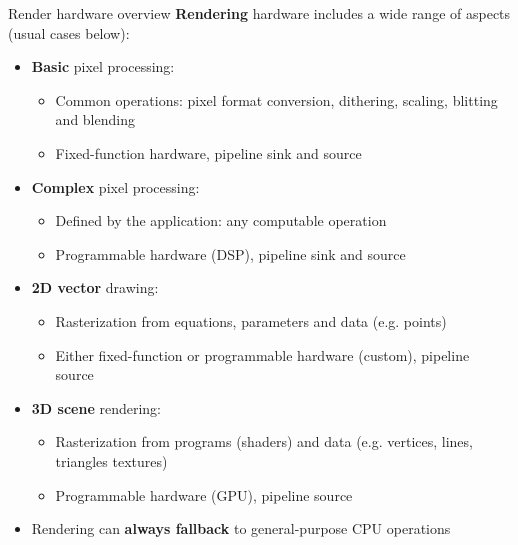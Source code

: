 \begin{frame}{Render hardware overview}
  \textbf{Rendering} hardware includes a wide range of aspects (usual cases below):
  \begin{itemize}
  \item \textbf{Basic} pixel processing:
  \begin{itemize}
    \item Common operations: pixel format conversion, dithering, scaling, blitting and blending
    \item Fixed-function hardware, pipeline sink and source
  \end{itemize}
  \item \textbf{Complex} pixel processing:
  \begin{itemize}
    \item Defined by the application: any computable operation
    \item Programmable hardware (DSP), pipeline sink and source
  \end{itemize}
  \item \textbf{2D vector} drawing:
  \begin{itemize}
    \item Rasterization from equations, parameters and data (e.g. points)
    \item Either fixed-function or programmable hardware (custom), pipeline source
  \end{itemize}
  \item \textbf{3D scene} rendering:
  \begin{itemize}
    \item Rasterization from programs (shaders) and data (e.g. vertices, lines, triangles textures)
    \item Programmable hardware (GPU), pipeline source
  \end{itemize}
  \item Rendering can \textbf{always fallback} to general-purpose CPU operations
  \end{itemize}
\end{frame}

